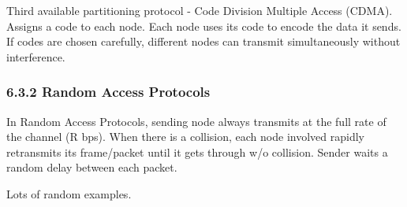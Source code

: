 \documentclass[11pt]{article}
\begin{document}
Third available partitioning protocol - Code Division Multiple Access (CDMA). Assigns a code to each node. Each node uses its code to encode the data it sends. If codes are chosen carefully, different nodes can transmit simultaneously without interference. 

\subsubsection{6.3.2 Random Access Protocols}
\label{sec:org6cf352b}
In Random Access Protocols, sending node always transmits at the full rate of the channel (R bps).
When there is a collision, each node involved rapidly retransmits its frame/packet until it gets through w/o collision. Sender waits a random delay between each packet.

Lots of random examples.
\end{document}
